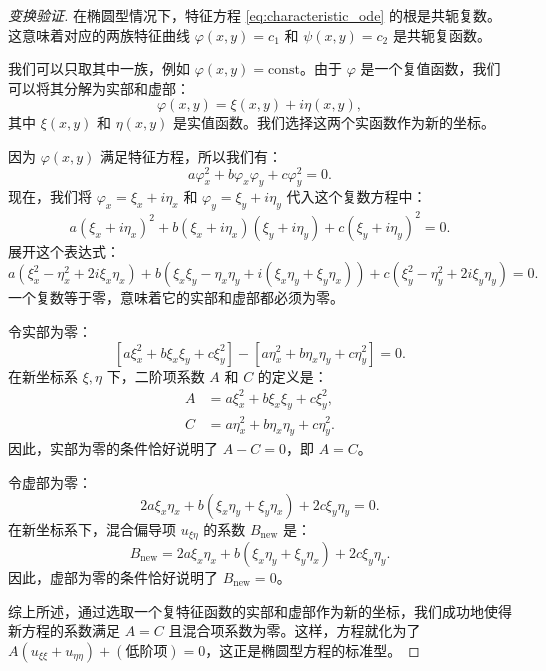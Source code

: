 \documentclass[12pt,a4paper]{article}
\numberwithin{subsection}{section}   %
\numberwithin{subsubsection}{subsection}
\theoremstyle{plain}
\theoremstyle{definition}
\theoremstyle{remark}
\theoremstyle{remark}
\begin{document}
\begin{proof}[变换验证]
	在椭圆型情况下，特征方程 \eqref{eq:characteristic_ode} 的根是共轭复数。这意味着对应的两族特征曲线 \(\varphi(x,y)=c_1\) 和 \(\psi(x,y)=c_2\) 是共轭复函数。
	
	我们可以只取其中一族，例如 \(\varphi(x,y) = \text{const}\)。由于 \(\varphi\) 是一个复值函数，我们可以将其分解为实部和虚部：
	\[
	\varphi(x,y) = \xi(x,y) + i\eta(x,y),
	\]
	其中 \(\xi(x,y)\) 和 \(\eta(x,y)\) 是实值函数。我们选择这两个实函数作为新的坐标。
	
	因为 \(\varphi(x,y)\) 满足特征方程，所以我们有：
	\begin{equation}\label{eq:complex_char_eq_phi}
		a\varphi_x^2 + b\varphi_x\varphi_y + c\varphi_y^2 = 0.
	\end{equation}
	现在，我们将 \(\varphi_x = \xi_x + i\eta_x\) 和 \(\varphi_y = \xi_y + i\eta_y\) 代入这个复数方程中：
	\[
	a(\xi_x + i\eta_x)^2 + b(\xi_x + i\eta_x)(\xi_y + i\eta_y) + c(\xi_y + i\eta_y)^2 = 0.
	\]
	展开这个表达式：
	\[
	a(\xi_x^2 - \eta_x^2 + 2i\xi_x\eta_x) + b(\xi_x\xi_y - \eta_x\eta_y + i(\xi_x\eta_y + \xi_y\eta_x)) + c(\xi_y^2 - \eta_y^2 + 2i\xi_y\eta_y) = 0.
	\]
	一个复数等于零，意味着它的实部和虚部都必须为零。
	
令实部为零：
	\[
	[a\xi_x^2 + b\xi_x\xi_y + c\xi_y^2] - [a\eta_x^2 + b\eta_x\eta_y + c\eta_y^2] = 0.
	\]
	在新坐标系 \(\xi, \eta\) 下，二阶项系数 \(A\) 和 \(C\) 的定义是：
	\begin{align*}
		A &= a\xi_x^2 + b\xi_x\xi_y + c\xi_y^2, \\
		C &= a\eta_x^2 + b\eta_x\eta_y + c\eta_y^2.
	\end{align*}
	因此，实部为零的条件恰好说明了 \(A - C = 0\)，即 \(A=C\)。
	
令虚部为零：
	\[
	2a\xi_x\eta_x + b(\xi_x\eta_y + \xi_y\eta_x) + 2c\xi_y\eta_y = 0.
	\]
	在新坐标系下，混合偏导项 \(u_{\xi\eta}\) 的系数 \(B_\text{new}\) 是：
	\[
	B_\text{new} = 2a\xi_x\eta_x + b(\xi_x\eta_y + \xi_y\eta_x) + 2c\xi_y\eta_y.
	\]
	因此，虚部为零的条件恰好说明了 \(B_\text{new} = 0\)。
	
	综上所述，通过选取一个复特征函数的实部和虚部作为新的坐标，我们成功地使得新方程的系数满足 \(A=C\) 且混合项系数为零。这样，方程就化为了 \(A(u_{\xi\xi} + u_{\eta\eta}) + (\text{低阶项}) = 0\)，这正是椭圆型方程的标准型。
\end{proof}
\end{document}
